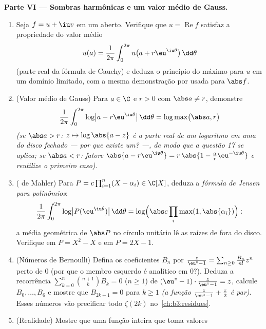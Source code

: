 \begin{problem}
\medskip
\noindent\textbf{Parte VI --- Sombras harmônicas e um valor médio de
Gauss.}
\begin{enumerate}[resume]
  \item Seja $f = u + \iu v$  em um aberto. Verifique que $u = \operatorname{Re}f$ satisfaz
        a propriedade do valor médio
        \[
        u(a) = \frac1{2\pi}\int_0^{2\pi}
        u\bigl(a + r\eu^{\iu\theta}\bigr)\,\dd\theta
        \]
        (parte real da fórmula de Cauchy) e deduza o princípio do
        máximo para $u$ em um domínio limitado, com a mesma
        demonstração por  usada para $\abs f$.
  \item (Valor médio de Gauss) Para $a \in \C$ e $r > 0$ com $\abs a \neq r$,
        demonstre
        \[
        \frac1{2\pi}\int_0^{2\pi}
        \log\bigl|a - r\eu^{\iu\theta}\bigr|\,\dd\theta
        = \log\max\bigl(\abs a, r\bigr)
        \]
        \emph{(se $\abs a > r$: $z \mapsto \log\abs{a - z}$ é a parte real de um logaritmo 
        em uma  do disco fechado --- por que existe um? ---, de
        modo que a questão 17 se aplica; se $\abs a < r$: fatore $\abs{a - r\eu^{\iu\theta}} = r\,\abs{1 -
        \frac ar\eu^{-\iu\theta}}$ e
        reutilize o primeiro caso)}.
  \item ( de Mahler) Para $P = c\prod_{i=1}^n(X -
        \alpha_i) \in \C[X]$, deduza a \emph{fórmula de Jensen
        para polinômios}:
        \[
        \frac1{2\pi}\int_0^{2\pi}\log\bigl|P(\eu^{\iu\theta})
        \bigr|\,\dd\theta
        = \log\Bigl(\abs c\prod_{i}\max(1,
        \abs{\alpha_i})\Bigr) :
        \]
        a média geométrica de $\abs P$ no círculo unitário lê as
        raízes de fora do disco. Verifique em $P =
        X^2 - X$ e em $P = 2X - 1$.
  \item (Números de Bernoulli) Defina os coeficientes $B_n$ por
        $\frac{z}{\eu^z - 1} = \sum_{n\geq0}\frac{B_n}{n!}
        z^n$ perto de $0$ (por que o membro esquerdo é analítico em
        $0$?). Deduza a recorrência $\sum_{k=0}^{n}\binom{n+1}kB_k = 0$ ($n \geq 1$) de $(\eu^z - 1)\cdot\frac z{\eu^z-1} = z$, calcule
        $B_0,
        \dots, B_6$ e mostre que $B_{2k+1} = 0$ para $k \geq 1$ \emph{(a função $\frac z{\eu^z-1} + \frac z2$ é par)}.
        Esses números vão precificar todo $\zeta(2k)$ no~\cref{ch:b3:residues}.
  \item (Realidade) Mostre que uma função inteira que toma valores

\end{enumerate}
\end{problem}
